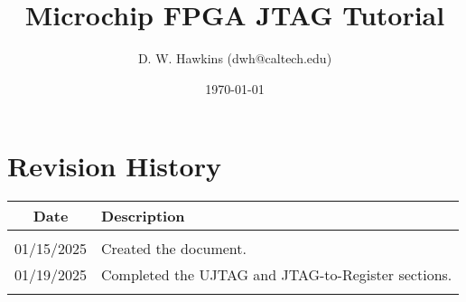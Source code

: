 \documentclass[10pt,twoside]{article}
\begin{document}
\title{Microchip FPGA JTAG Tutorial}
\author{D. W. Hawkins (dwh@caltech.edu)}
\date{\today}

\maketitle

\tableofcontents

\pagestyle{fancy}

\clearpage

%

\clearpage

\clearpage

\clearpage


\clearpage
\appendix
\section{Revision History}
%
\begin{table}[h]
\begin{center}
\begin{tabular}{|c|p{100mm}|}
\hline
Date & Description\\
\hline\hline
&\\
01/15/2025  & Created the document.\\
01/19/2025  & Completed the UJTAG and JTAG-to-Register sections.\\
&\\
\hline
\end{tabular}
\end{center}
\end{table}

%
%



\end{document}
